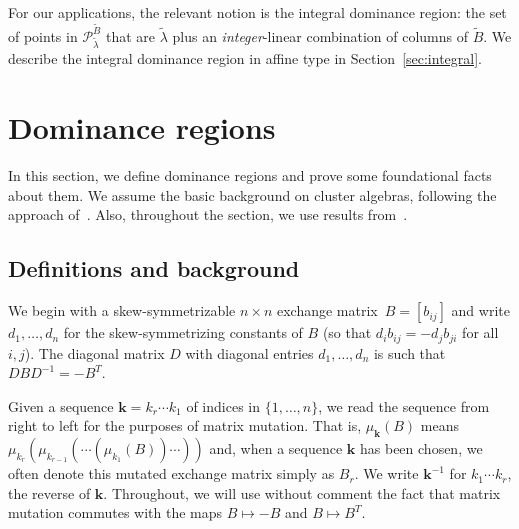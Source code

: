 \documentclass[10pt]{article}
\theoremstyle{definition}
\theoremstyle{remark}
\numberwithin{equation}{section}
\newcommand{\set}[1]{{\lbrace #1 \rbrace}}
\newcommand{\0}{{\mathbf{0}}}
\newcommand{\kk}{{\boldsymbol{k}}}
\newcommand{\tB}{{\widetilde{B}}}
\renewcommand{\P}{\mathcal{P}}
\newcommand{\symmetrizer}{{D}}
\begin{document}
For our applications, the relevant notion is the integral dominance region: the set of points in $\P_{\tilde\lambda}^\tB$ that are $\tilde\lambda$ plus an \emph{integer}-linear combination of columns of $\tB$.
We describe the integral dominance region in affine type in Section~\ref{sec:integral}.

\section{Dominance regions}
In this section, we define dominance regions and prove some foundational facts about them.
We assume the basic background on cluster algebras, following the approach of~\cite{ca4}.
Also, throughout the section, we use results from~\cite{NZ}.


\subsection{Definitions and background}\label{def sec}
We begin with a skew-symmetrizable $n \times n$ exchange matrix~$B=[b_{ij}]$ and write $d_1,\ldots,d_n$ for the skew-symmetrizing constants of $B$ (so that $d_i b_{ij}=-d_j b_{ji}$ for all~$i,j$).
The diagonal matrix $\symmetrizer$ with diagonal entries $d_1,\ldots,d_n$ is such that $\symmetrizer B\symmetrizer^{-1}=-B^T$.

Given a sequence $\kk=k_r\cdots k_1$ of indices in $\set{1,\ldots,n}$, we read the sequence from right to left for the purposes of matrix mutation.
That is, $\mu_\kk(B)$ means $\mu_{k_r}(\mu_{k_{r-1}}(\cdots(\mu_{k_1}(B))\cdots))$ and, when a sequence $\kk$ has been chosen, we often denote this mutated exchange matrix simply as $B_r$.
We write $\kk^{-1}$ for $k_1\cdots k_r$, the reverse of $\kk$.
Throughout, we will use without comment the fact that matrix mutation commutes with the maps $B\mapsto-B$ and $B\mapsto B^T$.
\end{document}
